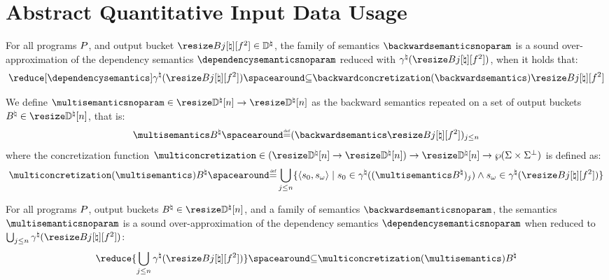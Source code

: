 \section{Abstract Quantitative Input Data Usage}

\begin{definition}
  For all programs $P$, and output bucket $\bucket\in\abstractdomain$, the family of semantics $\backwardsemanticsnoparam$ is a \textup{sound over-approximation} of the dependency semantics $\dependencysemanticsnoparam$ reduced with  $\abstractdomainconcretization(\bucket)$, when it holds that:
  \[\reduceddependencysemantics \SubseteQ \backwardconcretization(\backwardsemantics)\bucket\]
\end{definition}


\begin{definition}
  We define
$\multisemanticsnoparam\in\multitype$ as the backward semantics repeated on a set of output buckets $\buckets\in\vectorbuckets$, that is:
\begin{align*}
\multisemantics\buckets \DefeQ (\backwardsemantics\bucket)_{j\le n}
\end{align*}
where the concretization function $\multiconcretization\in(\multitype)\to\vectorbuckets\to\setof\pairofstates$ is defined as:
\begin{align*}\multiconcretization(\multisemantics)\buckets \DefeQ \bigsetjoin_{j\le n} \setdef{\inputoutputtuple{\defstate}}{\retrieveinput{\defstate}\in\abstractdomainconcretization((\multisemantics\buckets)_j)\land\retrieveoutput{\defstate}\in\abstractdomainconcretization(\bucket)}
\end{align*}
\end{definition}

\begin{lemma}
  For all programs $P$, output buckets $\buckets\in\vectorbuckets$, and a family of semantics $\backwardsemanticsnoparam$, the %
  semantics $\multisemanticsnoparam$ is a \textup{sound over-approximation} of the dependency semantics $\dependencysemanticsnoparam$ when reduced to $\bigsetjoin_{j\le n}\abstractdomainconcretization(\bucket)$:
  \[\reduce{\bigsetjoin_{j\le n}\abstractdomainconcretization(\bucket)} \SubseteQ \multiconcretization(\multisemantics)\buckets\]
\end{lemma}

